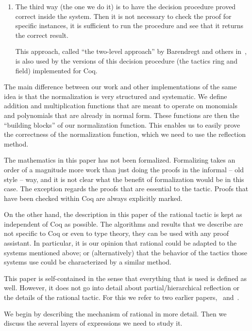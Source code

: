 \documentclass[numreferences]{kluwer}
\newcommand{\tacticname}[1]{\textsf{#1}}
\newcommand{\rational}{\tacticname{rational}}
\begin{document}
\begin{article}
\begin{enumerate}
\item
The third way (the one we do it) is to have the decision procedure
proved correct inside the system.
Then it is not necessary to check the proof for specific instances,
it is sufficient to run the procedure
and see that it returns the correct result.

This approach, called ``the two-level approach'' by Barendregt and others
in~\cite{bar:bar:ruy:96},
is also used by the versions of this decision
procedure (the tactics \tacticname{ring} and \tacticname{field})
implemented for Coq.
\end{enumerate}

The main difference between our work and other implementations
of the same idea is that the normalization is very structured
and systematic.
We define addition and multiplication functions
that are meant to operate on monomials and polynomials that are already
in normal form.
These functions are then the ``building blocks'' of our normalization
function.
This enables us to easily prove the correctness of the normalization
function, which we need to use the reflection method.

\bigskip

The mathematics in this paper has not been formalized.
Formalizing takes an order of a magnitude more work than just doing
the proofs in the informal -- old style -- way, and it is not clear
what the benefit of formalization would be in this case.
The exception regards the proofs that are essential to the
tactic.  Proofs that have been checked within Coq are
always explicitly marked.

On the other hand, the description in this paper of the {\rational}
tactic is kept as independent of Coq as possible.  The algorithms and
results that we describe are not specific to Coq or even to type
theory, they can be used with any proof assistant.
In particular, it is our opinion that {\rational} could be adapted
to the systems mentioned above; or (alternatively) that the behavior
of the tactics those systems use could be characterized by a similar
method.

This paper is self-contained in the sense that everything that
is used is defined as well.
However, it does not go into detail about partial/hierarchical reflection
or the details of the {\rational} tactic.
For this we refer to two earlier papers,~\cite{geu:wie:zwa:00}
and~\cite{lcf:wie:04}.

We begin by describing the mechanism of {\rational} in more detail.
Then we discuss the several layers of expressions we need to study
it.


\end{article}
\end{document}
